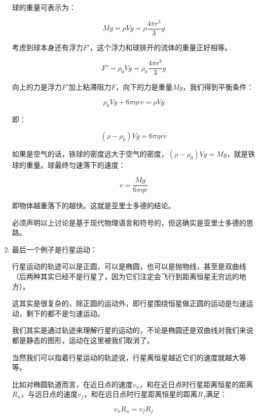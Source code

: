 \begin{enumerate}
球的重量可表示为：

\begin{equation*}
Mg = \rho V g = \rho \frac{4 \pi r^3}{3} g
\end{equation*}

考虑到球本身还有浮力$F'$，这个浮力和球排开的流体的重量正好相等。

\begin{equation*}
F' = \rho_0 V g = \rho_0 \frac{4 \pi r^3}{3} g
\end{equation*}

向上的力是浮力$F'$加上粘滞阻力$F$，向下的力是重量$Mg$，我们得到平衡条件：

\begin{equation*}
\rho_0 V g + 6 \pi \eta r v = \rho V g
\end{equation*}

即：

\begin{equation}
( \rho - \rho_0  ) V g = 6 \pi \eta r v
\end{equation}

如果是空气的话，铁球的密度远大于空气的密度，$(\rho - \rho_0) V g = Mg $，就是铁球的重量。球最终匀速落下的速度：

\begin{equation}
v = \frac{Mg}{ 6 \pi \eta r  }
\end{equation}

即物体越重落下的越快。这就是亚里士多德的结论。

必须声明以上讨论是基于现代物理语言和符号的，但这确实是亚里士多德的思路。

\item

最后一个例子是行星运动：

行星运动的轨迹可以是正圆，可以是椭圆，也可以是抛物线，甚至是双曲线（后两种其实已经不是行星了，因为它们注定会飞行到距离恒星无穷远的地方）。

这其实是很复杂的，除正圆的运动外，即行星围绕恒星做正圆的运动是匀速运动，剩下的都不是匀速运动。

我们其实是通过轨迹来理解行星的运动的，不论是椭圆还是双曲线对我们来说都是静态的图形，运动在这里被我们取消了。

当然我们可以指着行星运动的轨迹说，行星离恒星越近它们的速度就越大等等。

比如对椭圆轨道而言，在近日点的速度$v_n$，和在近日点时行星距离恒星的距离$R_n$，与远日点的速度$v_f$，和在远日点时行星距离恒星的距离$R_f$满足：

\begin{equation*}
v_n R_n = v_f R_f
\end{equation*}

\end{enumerate}

